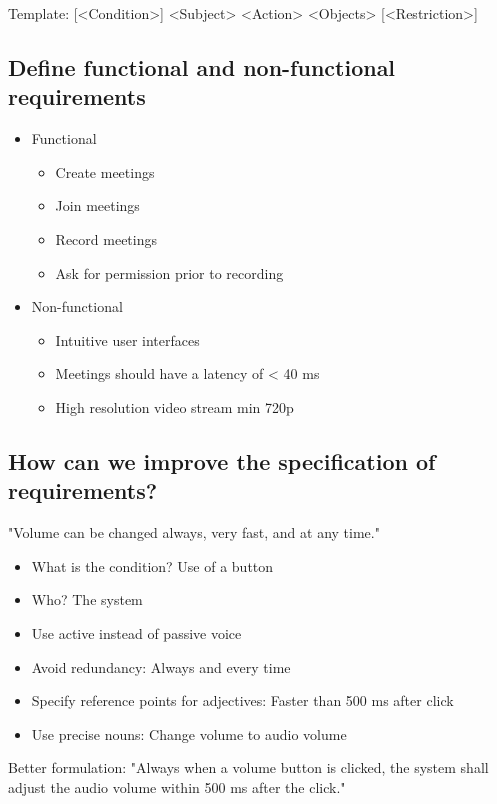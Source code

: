 \documentclass{article}
\begin{document}
Template:
[<Condition>] <Subject> <Action> <Objects> [<Restriction>]

\subsection{Define functional and non-functional requirements}
\begin{itemize}
    \item Functional
          \begin{itemize}
              \item Create meetings
              \item Join meetings
              \item Record meetings
              \item Ask for permission prior to recording
          \end{itemize}
    \item Non-functional
          \begin{itemize}
              \item Intuitive user interfaces
              \item Meetings should have a latency of < 40 ms
              \item High resolution video stream min 720p
          \end{itemize}
\end{itemize}

\subsection{How can we improve the specification of requirements?}
"Volume can be changed always, very fast, and at any time."
\begin{itemize}
    \item What is the condition? Use of a button
    \item Who? The system
    \item Use active instead of passive voice
    \item Avoid redundancy: Always and every time
    \item Specify reference points for adjectives: Faster than 500 ms after click
    \item Use precise nouns: Change volume to audio volume
\end{itemize}
Better formulation: "Always when a volume button is clicked, the system shall adjust the audio volume within 500 ms after the click."
\end{document}

